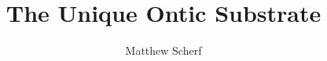\documentclass[11pt,a4paper]{article}
\begin{document}
\title{The Unique Ontic Substrate}
\author{Matthew Scherf}
\maketitle

\tableofcontents
\bigskip


\end{document}
